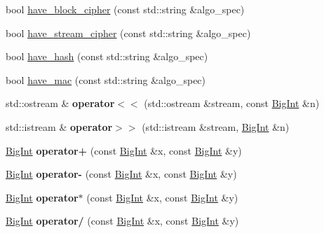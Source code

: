 \begin{DoxyCompactItemize}
bool \hyperlink{namespaceBotan_afc43f49416f38856ec3066707098f01e}{have\-\_\-block\-\_\-cipher} (const std\-::string \&algo\-\_\-spec)
\item 
bool \hyperlink{namespaceBotan_a0f1b2b98fadd1ee8508dfc2b84b20433}{have\-\_\-stream\-\_\-cipher} (const std\-::string \&algo\-\_\-spec)
\item 
bool \hyperlink{namespaceBotan_a3f5b191a3f0a526c957cbd239f684c1e}{have\-\_\-hash} (const std\-::string \&algo\-\_\-spec)
\item 
bool \hyperlink{namespaceBotan_a3e0902a3d2b22f730d168670e27b2ed0}{have\-\_\-mac} (const std\-::string \&algo\-\_\-spec)
\item 
\hypertarget{namespaceBotan_a3a428e96d854dd3a0b306d6b40fca8d7}{std\-::ostream \& {\bfseries operator$<$$<$} (std\-::ostream \&stream, const \hyperlink{classBotan_1_1BigInt}{Big\-Int} \&n)}\label{namespaceBotan_a3a428e96d854dd3a0b306d6b40fca8d7}

\item 
\hypertarget{namespaceBotan_a8f5735ead6f326b274dbb7015b5f4861}{std\-::istream \& {\bfseries operator$>$$>$} (std\-::istream \&stream, \hyperlink{classBotan_1_1BigInt}{Big\-Int} \&n)}\label{namespaceBotan_a8f5735ead6f326b274dbb7015b5f4861}

\item 
\hypertarget{namespaceBotan_ab1ccaae8a1023d5d2b55dfc31f1550f7}{\hyperlink{classBotan_1_1BigInt}{Big\-Int} {\bfseries operator+} (const \hyperlink{classBotan_1_1BigInt}{Big\-Int} \&x, const \hyperlink{classBotan_1_1BigInt}{Big\-Int} \&y)}\label{namespaceBotan_ab1ccaae8a1023d5d2b55dfc31f1550f7}

\item 
\hypertarget{namespaceBotan_abc6e2c7007b0ede63a86f0fb1ded398f}{\hyperlink{classBotan_1_1BigInt}{Big\-Int} {\bfseries operator-\/} (const \hyperlink{classBotan_1_1BigInt}{Big\-Int} \&x, const \hyperlink{classBotan_1_1BigInt}{Big\-Int} \&y)}\label{namespaceBotan_abc6e2c7007b0ede63a86f0fb1ded398f}

\item 
\hypertarget{namespaceBotan_a97d0eec3d8d8e74d89542c11063437b9}{\hyperlink{classBotan_1_1BigInt}{Big\-Int} {\bfseries operator$\ast$} (const \hyperlink{classBotan_1_1BigInt}{Big\-Int} \&x, const \hyperlink{classBotan_1_1BigInt}{Big\-Int} \&y)}\label{namespaceBotan_a97d0eec3d8d8e74d89542c11063437b9}

\item 
\hypertarget{namespaceBotan_a34351e35d07339d3e0b3f36afe8c4b5b}{\hyperlink{classBotan_1_1BigInt}{Big\-Int} {\bfseries operator/} (const \hyperlink{classBotan_1_1BigInt}{Big\-Int} \&x, const \hyperlink{classBotan_1_1BigInt}{Big\-Int} \&y)}\label{namespaceBotan_a34351e35d07339d3e0b3f36afe8c4b5b}


\end{DoxyCompactItemize}
